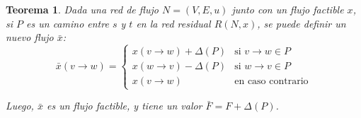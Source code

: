 \documentclass[a4paper]{report}
\newcommand{\si}{\text{si }}
\newcommand{\ecc}{\text{en caso contrario}}
\newtheorem*{theorem*}{Teorema}
\begin{document}
\label{teorema-camino-aumento}
\begin{theorem*}
    Dada una red de flujo $N = (V, E, u)$ junto con un flujo factible $x$, si $P$ es un camino entre $s$ y $t$ en la red residual $R(N, x)$, se puede definir un nuevo flujo $\bar{x}$:
    $$
        \bar{x}(v \rightarrow w) =
        \begin{cases}
            x(v \rightarrow w) + \Delta(P) & \si v \rightarrow w \in P \\
            x(w \rightarrow v) - \Delta(P) & \si w \rightarrow v \in P \\
            x(v \rightarrow w)             & \ecc
        \end{cases}
    $$

    Luego, $\bar{x}$ es un flujo factible, y tiene un valor $\bar{F} = F + \Delta(P)$.
\end{theorem*}
\end{document}

